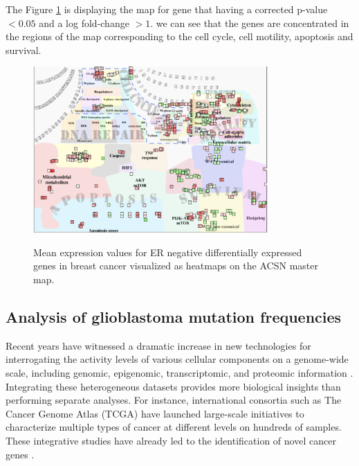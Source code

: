 \documentclass[article]{jss}
\begin{document}
The Figure \ref{fig:mainz} is displaying the map for gene that having a
corrected p-value $< 0.05$ and a log fold-change $>1$. we can see that the genes
are concentrated in the regions of the map corresponding to the cell cycle, cell
motility, apoptosis and survival.

\begin{figure}[!ht]
  \caption{Mean expression values for ER negative differentially expressed
  genes in breast cancer visualized as heatmaps on the ACSN master map.} 
  \centering
  \includegraphics[width=0.8\textwidth]{figures/mainz_acsn.pdf}
  \label{fig:mainz}
\end{figure}

\subsection{Analysis of glioblastoma mutation frequencies}

Recent years have witnessed a dramatic increase in new technologies for
interrogating the activity levels of various cellular components on a
genome-wide scale, including genomic, epigenomic, transcriptomic, and proteomic
information \citep{hawkins2010next}. Integrating these heterogeneous datasets
provides more biological insights than performing separate analyses. For
instance, international consortia such as The Cancer Genome Atlas (TCGA) have
launched large-scale initiatives to characterize multiple types of cancer at
different levels on hundreds of samples.  These integrative studies have
already led to the identification of novel cancer genes
\citep{mclendon2008comprehensive}. 
\end{document}
